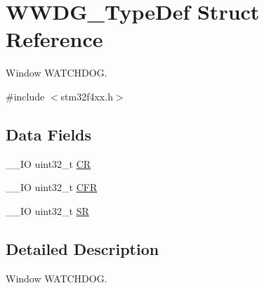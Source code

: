 \hypertarget{struct_w_w_d_g___type_def}{\section{W\-W\-D\-G\-\_\-\-Type\-Def Struct Reference}
\label{struct_w_w_d_g___type_def}
}


Window W\-A\-T\-C\-H\-D\-O\-G.  




{\ttfamily \#include $<$stm32f4xx.\-h$>$}

\subsection*{Data Fields}
\begin{DoxyCompactItemize}
\item 
\-\_\-\-\_\-\-I\-O uint32\-\_\-t \hyperlink{struct_w_w_d_g___type_def_ab40c89c59391aaa9d9a8ec011dd0907a}{C\-R}
\item 
\-\_\-\-\_\-\-I\-O uint32\-\_\-t \hyperlink{struct_w_w_d_g___type_def_ac011ddcfe531f8e16787ea851c1f3667}{C\-F\-R}
\item 
\-\_\-\-\_\-\-I\-O uint32\-\_\-t \hyperlink{struct_w_w_d_g___type_def_af6aca2bbd40c0fb6df7c3aebe224a360}{S\-R}
\end{DoxyCompactItemize}


\subsection{Detailed Description}
Window W\-A\-T\-C\-H\-D\-O\-G. 

